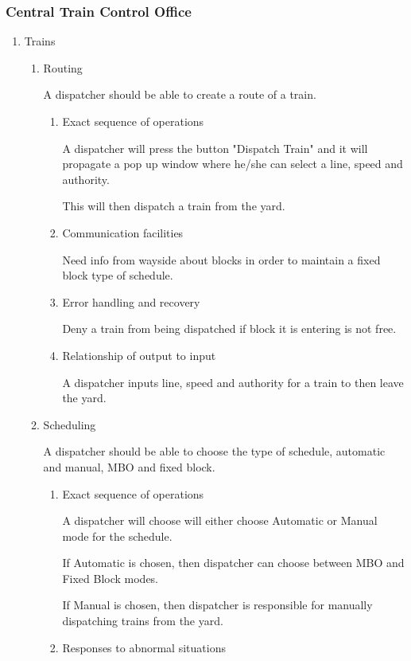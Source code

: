\documentclass[11pt]{article}
\begin{document}
\subsubsection{Central Train Control Office}
\label{sec-3-1-1}
\begin{enumerate}
\item Trains
\label{sec-3-1-1-1}
\begin{enumerate}
\item Routing
\label{sec-3-1-1-1-1}

A dispatcher should be able to create a route of a train.
\begin{enumerate}
\item Exact sequence of operations
\label{sec-3-1-1-1-1-1}

A dispatcher will press the button "Dispatch Train" and it will propagate a pop up window where he/she can select a line, speed and authority.

This will then dispatch a train from the yard.
\item Communication facilities
\label{sec-3-1-1-1-1-2}

Need info from wayside about blocks in order to maintain a fixed block type of schedule.
\item Error handling and recovery
\label{sec-3-1-1-1-1-3}

Deny a train from being dispatched if block it is entering is not free.
\item Relationship of output to input
\label{sec-3-1-1-1-1-4}

A dispatcher inputs line, speed and authority for a train to then leave the yard.
\end{enumerate}
\item Scheduling
\label{sec-3-1-1-1-2}

A dispatcher should be able to choose the type of schedule, automatic and manual, MBO and fixed block. 
\begin{enumerate}
\item Exact sequence of operations
\label{sec-3-1-1-1-2-1}

A dispatcher will choose will either choose Automatic or Manual mode for the schedule.

If Automatic is chosen, then dispatcher can choose between MBO and Fixed Block modes.

If Manual is chosen, then dispatcher is responsible for manually dispatching trains from the yard.
\item Responses to abnormal situations
\label{sec-3-1-1-1-2-2}


\end{enumerate}
\end{enumerate}
\end{enumerate}
\end{document}
